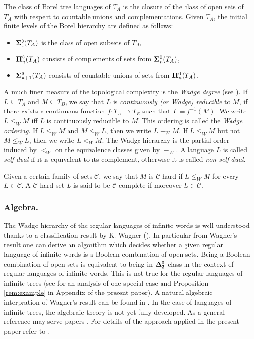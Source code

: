 The class of Borel tree languages of $T_A$ is the
closure of the class of open sets of $T_A$ with respect to countable unions and
complementations. Given $T_A$, the initial finite levels of the
Borel hierarchy are defined as follows: %
\begin{itemize}
\item ${\bf\Sigma}^0_1(T_A)$ is the class of open subsets of $T_A$, 
\item ${\bf\Pi}^0_n(T_A)$ consists of complements of sets from ${\bf\Sigma}^0_n(T_A)$, 
\item ${\bf\Sigma}^0_{n+1}(T_A)$ consists of countable unions of sets from ${\bf\Pi}^0_n(T_A)$. 
\end{itemize}
A much finer measure of the topological complexity is the \emph{Wadge degree} (see \cite[Chapter 21.E]{kechris}).
If $L \subseteq T_A$ and $M\subseteq T_B$, we say that $L$ is \emph{continuously (or Wadge)
reducible} to $M$, if there exists a continuous function $f: T_A \to T_B$ such that $L=
f^{-1}(M)$. We write $L \leq_W M$ iff $L$ is continuously reducible to $M$.
This ordering is called the {\em Wadge ordering}. If $L \leq_W M$ and $M \leq_W L$, then we write $L
\equiv_W M$. If $L \leq_W M$ but not $M \leq_W L$, then we write $L<_W
M$. The Wadge hierarchy is the partial order induced by $<_W$ on the
equivalence classes given by $\equiv_W$. A language  $L$ is called {\em self dual} if it is equivalent 
to its complement, otherwise it is called {\em non self dual}.

Given a certain family of sets $\mathcal{C}$, we say that $M$ is $\mathcal{C}$-hard if $L
\leq_W M$ for every $L \in \mathcal{C}$. A    $\mathcal{C}$-hard set $L$ is said to be $\mathcal{C}$-complete if 
moreover $L \in \mathcal{C}$.
\subsubsection*{Algebra.}
The Wadge hierarchy of the regular languages of infinite words is well understood thanks to a classification result by K. Wagner (\cite{wagner}). In particular from Wagner's result one can derive an algorithm which decides whether a given regular language of infinite words is a Boolean combination of open sets. Being a Boolean combination of open sets is equivalent to being in ${\bf \Delta^0_2}$ class in the context of regular languages of infinite words. This is not true for the regular languages of infinite trees (see \cite[Section 4.1]{bp} for an analysis of one special case and Proposition \ref{rem:example} in Appendix of the present paper).   A natural algebraic interpration of Wagner's result can be found in \cite[Theorem V.6.2]{pinperrin}. In the case of languages of infinite trees, the algebraic theory is not yet fully developed. As a general reference may serve papers \cite{blumensath,bp,bojtrees,bojidziaszek}. For details of the approach applied in the present paper refer to \cite[Section 3]{bp}. 

